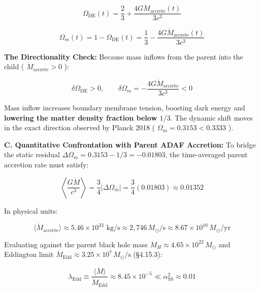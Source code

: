 \documentclass[11pt,a4paper]{article}
\theoremstyle{definition}\newtheorem{definition}{Definition}
\theoremstyle{remark}\newtheorem{remark}{Remark}
\begin{document}
\begin{equation}
\boxed{\Omega_{\text{DE}}(t) = \frac{2}{3} + \frac{4 G \dot{M}_{\text{accrete}}(t)}{3 c^3}}
\end{equation}



\begin{equation}
\boxed{\Omega_m(t) = 1 - \Omega_{\text{DE}}(t) = \frac{1}{3} - \frac{4 G \dot{M}_{\text{accrete}}(t)}{3 c^3}}
\end{equation}


\textbf{The Directionality Check:}
Because mass inflows from the parent into the child ( $\dot{M}_{\text{accrete}} > 0$ ):


\begin{equation}
\delta\Omega_{\text{DE}} > 0, \qquad \delta\Omega_m = -\frac{4 G \dot{M}_{\text{accrete}}}{3 c^3} < 0
\end{equation}


Mass inflow increases boundary membrane tension, boosting dark energy and \textbf{lowering the matter density fraction below $1/3$}. The dynamic shift moves in the exact direction observed by Planck 2018 ( $\Omega_m = 0.3153 < 0.3333$ ).

\textbf{C. Quantitative Confrontation with Parent ADAF Accretion:}
To bridge the static residual $\Delta\Omega_m = 0.3153 - 1/3 = -0.01803$, the time-averaged parent accretion rate must satisfy:


\begin{equation}
\left\langle \frac{G \dot{M}}{c^3} \right\rangle = \frac{3}{4} |\Delta\Omega_m| = \frac{3}{4}(0.01803) \approx 0.01352
\end{equation}


In physical units:


\begin{equation}
\langle\dot{M}_{\text{accrete}}\rangle \approx 5.46 \times 10^{33}\text{ kg/s} \approx 2{,}746 \, M_\odot/\text{s} \approx 8.67 \times 10^{10} \, M_\odot/\text{yr}
\end{equation}


Evaluating against the parent black hole mass $M_H \approx 4.65 \times 10^{22} \, M_\odot$ and Eddington limit $\dot{M}_{\text{Edd}} \approx 3.25 \times 10^7 \, M_\odot/\text{s}$ (§4.15.3):


\begin{equation}
\lambda_{\text{Edd}} \equiv \frac{\langle\dot{M}\rangle}{\dot{M}_{\text{Edd}}} \approx 8.45 \times 10^{-5} \ll \alpha_{\text{SS}}^2 \approx 0.01
\end{equation}
\end{document}
